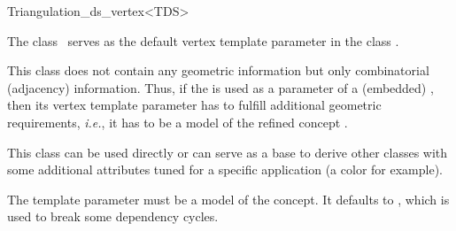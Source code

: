 \begin{ccRefClass}{Triangulation_ds_vertex<TDS>}

\ccDefinition

The class \ccRefName\ serves as the default vertex template parameter in the
class .

This class does not contain any geometric information but only combinatorial
(adjacency) information. Thus, if the  is
used as a parameter of a (embedded) , then its vertex template parameter
has to fulfill additional geometric requirements, \emph{i.e.}, it has to be a
model of the refined concept .

This class can be used directly or can serve as a base to derive other classes
with some additional attributes tuned for a specific application (a color for
example).


\ccParameters

The template parameter  must be a model of the
 concept. It defaults to , which is
used to break some dependency cycles.

\ccIsModel


\ccSeeAlso


\end{ccRefClass}
